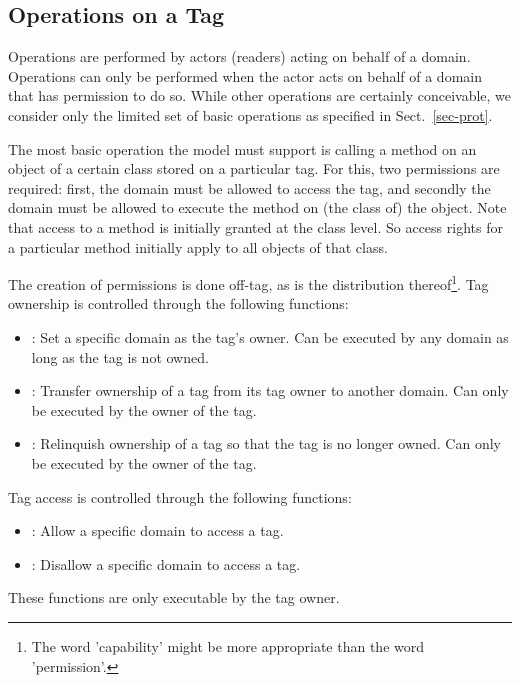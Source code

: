\subsection{Operations on a Tag}
\label{ssec-operations}

Operations are performed by actors (readers) acting on behalf of a domain.
Operations can only be performed when the actor acts on behalf of a domain that
has permission to do so. While other operations are certainly conceivable, 
we consider only the limited set of basic operations as specified in Sect.~\ref{sec-prot}.

The most basic operation the model must support is calling a method on an
object of a certain class stored on a particular tag. For this, two permissions are
required: first, the domain must be allowed to access the tag, and secondly the domain 
must be allowed to execute the method on (the class of) the object. Note that access to a
method is initially granted at the class level. So access rights for a
particular method initially apply to all objects of that class.

The creation of permissions is done off-tag, as is the distribution 
thereof\footnote{The word 'capability' might be more appropriate than the word
	'permission'.
}.
Tag ownership is controlled through the following functions:
\begin{itemize}
\fixlistspacing
\item {}: Set a specific domain as the tag's owner. Can be
  executed by any domain as long as the tag is not owned.
\item {}: Transfer ownership of a tag from its tag
  owner to another domain. Can only be executed by the owner of the tag.
\item {}: Relinquish ownership of a tag so that the
  tag is no longer owned. Can only be executed by the owner of the tag.
\end{itemize}
Tag access is controlled through the following functions:
\begin{itemize} 
\fixlistspacing
\item {}: Allow a specific domain to access a tag. 
\item {}: Disallow a specific domain to access a tag.
\end{itemize}
These functions are only executable by the tag owner.



